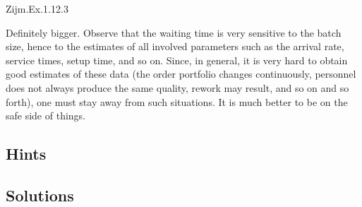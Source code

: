 \begin{exercise}
Zijm.Ex.1.12.3
 \begin{solution}
   Definitely bigger. Observe that the waiting time is very sensitive
   to the batch size, hence to the estimates of all involved
   parameters such as the arrival rate, service times, setup time, and
   so on. Since, in general, it is very hard to obtain good estimates
   of these data (the order portfolio changes continuously, personnel
   does not always produce the same quality, rework may result, and so
   on and so forth), one must stay away from such situations. It is
   much better to be on the safe side of things.
\end{solution}
\end{exercise}





\subsection*{Hints}

\subsection*{Solutions}





